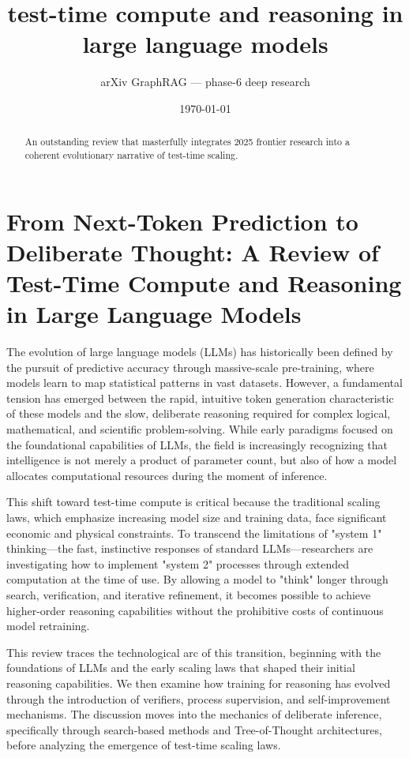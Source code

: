 \documentclass[11pt]{article}
\title{test-time compute and reasoning in large language models}
\author{arXiv GraphRAG --- phase-6 deep research}
\date{\today}
\begin{document}
\maketitle

\begin{abstract}
An outstanding review that masterfully integrates 2025 frontier research into a coherent evolutionary narrative of test-time scaling.
\end{abstract}

\section{From Next-Token Prediction to Deliberate Thought: A Review of Test-Time Compute and Reasoning in Large Language Models}

The evolution of large language models (LLMs) has historically been defined by the pursuit of predictive accuracy through massive-scale pre-training, where models learn to map statistical patterns in vast datasets. However, a fundamental tension has emerged between the rapid, intuitive token generation characteristic of these models and the slow, deliberate reasoning required for complex logical, mathematical, and scientific problem-solving. While early paradigms focused on the foundational capabilities of LLMs, the field is increasingly recognizing that intelligence is not merely a product of parameter count, but also of how a model allocates computational resources during the moment of inference.

This shift toward test-time compute is critical because the traditional scaling laws, which emphasize increasing model size and training data, face significant economic and physical constraints. To transcend the limitations of "system 1" thinking—the fast, instinctive responses of standard LLMs—researchers are investigating how to implement "system 2" processes through extended computation at the time of use. By allowing a model to "think" longer through search, verification, and iterative refinement, it becomes possible to achieve higher-order reasoning capabilities without the prohibitive costs of continuous model retraining.

This review traces the technological arc of this transition, beginning with the foundations of LLMs and the early scaling laws that shaped their initial reasoning capabilities. We then examine how training for reasoning has evolved through the introduction of verifiers, process supervision, and self-improvement mechanisms. The discussion moves into the mechanics of deliberate inference, specifically through search-based methods and Tree-of-Thought architectures, before analyzing the emergence of test-time scaling laws.
\end{document}

